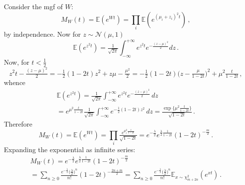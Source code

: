 \documentclass[a4paper,10pt]{article}
\begin{document}
Consider the mgf of $W$:
$$
M_W(t)
  = \mathbb{E}(e^{Wt})
  = \prod_i \mathbb{E}(e^{(\mu_i + z_i)^2 t})
  \,, $$
by independence. Now for $z \sim \mathcal{N}(\mu, 1)$
$$
\mathbb{E}(e^{z^2 t})
  = \tfrac1{\sqrt{2\pi}}
  \int_{-\infty}^{+\infty}
      e^{z^2 t} e^{-\tfrac{(z-\mu)^2}2}
  dz
  \,. $$
Now, for $t < \tfrac12$
$$
z^2 t - \tfrac{(z - \mu)^2}2
  = - \tfrac12 (1 - 2t) z^2 + z \mu - \tfrac{\mu^2}2
  = - \tfrac12 (1 - 2t) \bigl( z - \tfrac\mu{1 - 2t} \bigr)^2
    + \mu^2 \tfrac{t}{1 - 2t}
  \,, $$
whence
\begin{multline}
  \mathbb{E}(e^{z^2 t})
    = \tfrac1{\sqrt{2\pi}}
      \int_{-\infty}^{+\infty}
        e^{z^2 t} e^{-\tfrac{(z-\mu)^2}2}
      \, dz
    \\= e^{\mu^2 \tfrac{t}{1 - 2t}}
      \tfrac1{\sqrt{2\pi}}
      \int_{-\infty}^{+\infty}
        e^{- \tfrac12 (1 - 2t) z^2}
      \, dz
    = \tfrac{
        \exp{\{\mu^2 \tfrac{t}{1 - 2t}\}}
    }{\sqrt{1 - 2t}}
    \,.
\end{multline}
Therefore
$$
M_W(t)
  = \mathbb{E}(e^{Wt})
  = \prod_i \tfrac{
      e^{\mu_i^2 \tfrac{t}{1 - 2t}}
    }{\sqrt{1 - 2t}}
  = e^{- \tfrac\lambda2} e^{\tfrac\lambda2 \tfrac1{1 - 2t}}
  (1 - 2t)^{-\tfrac{m}2}
  \,. $$
Expanding the exponential as infinite series:
\begin{multline}
  M_W(t)
    = e^{- \tfrac\lambda2} e^{\tfrac\lambda2 \tfrac1{1 - 2t}}
    (1 - 2t)^{-\tfrac{m}2}
    \\= \sum_{n \geq 0} \tfrac{e^{- \tfrac\lambda2} \bigl(\tfrac\lambda2\bigr)^n}{n!}
        (1 - 2t)^{-\tfrac{2n + m}2}
    = \sum_{n \geq 0} \tfrac{e^{- \tfrac\lambda2} \bigl(\tfrac\lambda2\bigr)^n}{n!}
        \mathbb{E}_{x \sim \chi^2_{m + 2n}}(e^{x t})
    \,.
\end{multline}


\end{document}
